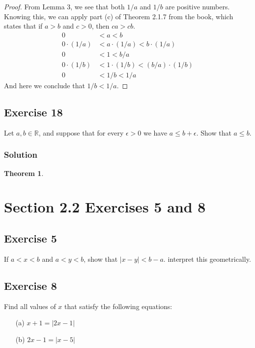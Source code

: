 \documentclass[12pt]{article}
\newtheorem*{thm}{Theorem}
\begin{document}
\begin{proof}
From Lemma 3, we see that both $1/a$ and $1/b$ are positive numbers. Knowing this, we can apply part (c) of Theorem 2.1.7 from the book, which states that if $a > b$ and $c > 0$, then $ca > cb$.
\begin{align*}
0 &< a < b \\
0\cdot\left(1/a\right) &< a\cdot\left(1/a\right) < b\cdot\left(1/a\right) \\
0 &< 1 < b / a \\
0\cdot\left(1/b\right) &< 1\cdot\left(1/b\right) < \left(b / a\right)\cdot\left(1 / b\right)\\
0 &< 1/b < 1/a
\end{align*}
And here we conclude that $1 / b < 1 / a$.
\end{proof}

\subsection*{Exercise 18}
Let $a, b \in \mathbb{R}$, and suppose that for every $\epsilon > 0$ we have $a \leq b + \epsilon$. Show that $a \leq b$.

\subsubsection*{Solution}
\begin{thm}
\end{thm}

\section*{Section 2.2 Exercises 5 and 8}

\subsection*{Exercise 5}
If $a < x < b$ and $a < y < b$, show that $\left|x - y\right| < b - a$. interpret this geometrically.

\subsection*{Exercise 8}
Find all values of $x$ that satisfy the following equations:
\begin{itemize}
\item[(a)] $x + 1 = \left|2x - 1\right|$
\item[(b)] $2x - 1 = \left|x - 5\right|$
\end{itemize}
\end{document}
